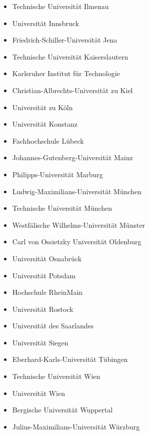 \begin{itemize}
    \item Technische Universität Ilmenau
    \item Universität Innsbruck
    \item Friedrich-Schiller-Universität Jena
    \item Technische Universität Kaiserslautern
    \item Karlsruher Institut für Technologie
    \item Christian-Albrechts-Universität zu Kiel
    \item Universität zu Köln
    \item Universität Konstanz
    \item Fachhochschule Lübeck
    \item Johannes-Gutenberg-Universität Mainz
    \item Philipps-Universität Marburg
    \item Ludwig-Maximilians-Universität München
    \item Technische Universität München
    \item Westfälische Wilhelms-Universität Münster
    \item Carl von Ossietzky Universität Oldenburg
    \item Universität Osnabrück
    \item Universität Potsdam
    \item Hochschule RheinMain
    \item Universität Rostock
    \item Universität des Saarlandes
    \item Universität Siegen
    \item Eberhard-Karls-Universität Tübingen
    \item Technische Universität Wien
    \item Universität Wien
    \item Bergische Universität Wuppertal
    \item Julius-Maximilians-Universität Würzburg
  \end{itemize}
